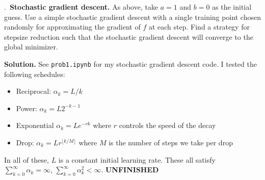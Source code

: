 \documentclass{letter}
\newcounter{problem}
\newcommand{\Problem}[2]{%
	\stepcounter{problem}%
	\leftskip=0pt%
	\theproblem.~\textbf{{#1.}} #2 \par%
}
\newcommand{\Solution}[1]{%
	\textbf{Solution.} #1 \par%
}
\newcommand{\UNFINISHED}{\textbf{\color{red} UNFINISHED}}
\begin{document}
    \Problem{Stochastic gradient descent}{As above, take $a = 1$ and $b = 0$ as the initial guess. Use a simple stochastic gradient descent with a single training point chosen randomly for approximating the gradient of $f$ at each step. Find a strategy for stepsize reduction such that the stochastic gradient descent will converge to the global minimizer.}
    \Solution{See \texttt{prob1.ipynb} for my stochastic gradient descent code. I tested the following schedules: \begin{itemize}
        \item Reciprocal: $\alpha_k = L/k$
        \item Power: $\alpha_k = L2^{-k-1}$
        \item Exponential $\alpha_k = Le^{-rk}$ where $r$ controls the speed of the decay
        \item Drop: $\alpha_k = Lr^{\lfloor k/M \rfloor}$ where $M$ is the number of steps we take per drop
    \end{itemize} In all of these, $L$ is a constant initial learning rate. These all satisfy $\sum_{k=0}^\infty \alpha_k = \infty$, $\sum_{k=0}^\infty \alpha_k^2 < \infty$. \UNFINISHED}
\end{document}
